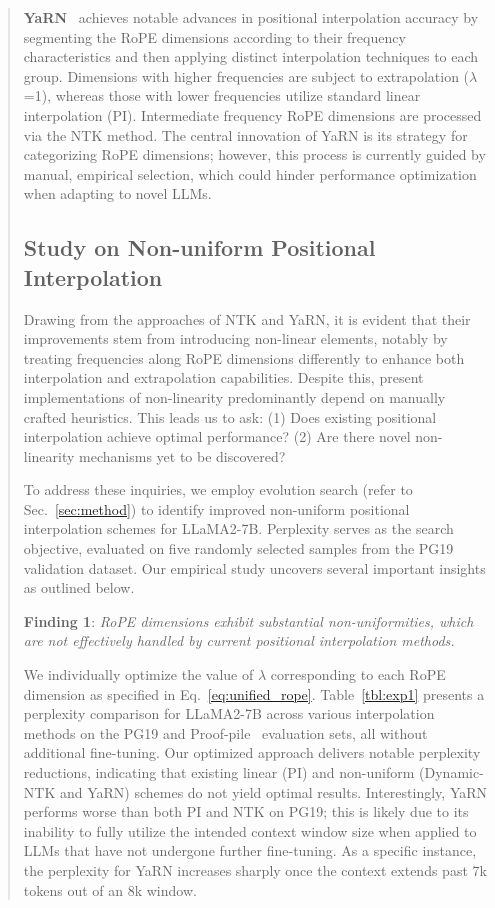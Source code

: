 \begin{abstract}
\textbf{YaRN}~\cite{yarn} achieves notable advances in positional interpolation accuracy by segmenting the RoPE dimensions according to their frequency characteristics and then applying distinct interpolation techniques to each group. Dimensions with higher frequencies are subject to extrapolation ($\lambda$=1), whereas those with lower frequencies utilize standard linear interpolation (PI). Intermediate frequency RoPE dimensions are processed via the NTK method. The central innovation of YaRN is its strategy for categorizing RoPE dimensions; however, this process is currently guided by manual, empirical selection, which could hinder performance optimization when adapting to novel LLMs.

\subsection{Study on Non-uniform Positional Interpolation}

Drawing from the approaches of NTK and YaRN, it is evident that their improvements stem from introducing non-linear elements, notably by treating frequencies along RoPE dimensions differently to enhance both interpolation and extrapolation capabilities. Despite this, present implementations of non-linearity predominantly depend on manually crafted heuristics. This leads us to ask: (1) Does existing positional interpolation achieve optimal performance? (2) Are there novel non-linearity mechanisms yet to be discovered?

To address these inquiries, we employ evolution search (refer to Sec.~\ref{sec:method}) to identify improved non-uniform positional interpolation schemes for LLaMA2-7B. Perplexity serves as the search objective, evaluated on five randomly selected samples from the PG19~\cite{pg19} validation dataset. Our empirical study uncovers several important insights as outlined below.

\textbf{Finding 1}: \textit{RoPE dimensions exhibit substantial non-uniformities, which are not effectively handled by current positional interpolation methods.}

We individually optimize the value of $\lambda$ corresponding to each RoPE dimension as specified in Eq.~\ref{eq:unified_rope}. Table~\ref{tbl:exp1} presents a perplexity comparison for LLaMA2-7B across various interpolation methods on the PG19 and Proof-pile~\cite{proof-pile} evaluation sets, all without additional fine-tuning. Our optimized approach delivers notable perplexity reductions, indicating that existing linear (PI) and non-uniform (Dynamic-NTK and YaRN) schemes do not yield optimal results. Interestingly, YaRN performs worse than both PI and NTK on PG19; this is likely due to its inability to fully utilize the intended context window size when applied to LLMs that have not undergone further fine-tuning. As a specific instance, the perplexity for YaRN increases sharply once the context extends past 7k tokens out of an 8k window.


\end{abstract}
